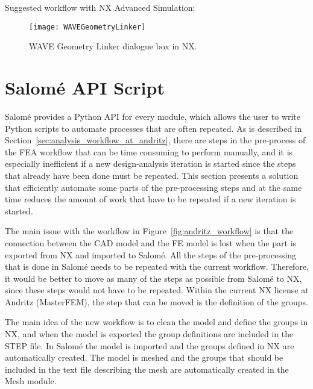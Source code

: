
Suggested workflow with NX Advanced Simulation:

\begin{figure}[t]
	\begin{center}
		\texttt{[image: WAVEGeometryLinker]}
	\end{center}
	\caption{WAVE Geometry Linker dialogue box in NX.}
	\label{fig:WAVEGeometryLinker}
\end{figure}

\section{Salomé API Script} %
\label{sec:salom_api_script}
Salomé provides a Python API for every module, which allows the user to write Python scripts to automate processes that are often repeated. As is described in Section~\ref{sec:analysis_workflow_at_andritz}, there are steps in the pre-process of the FEA workflow that can be time consuming to perform manually, and it is especially inefficient if a new design-analysis iteration is started since the steps that already have been done must be repeated. This section presents a solution that efficiently automate some parts of the pre-processing steps and at the same time reduces the amount of work that have to be repeated if a new iteration is started.

The main issue with the workflow in Figure~\ref{fig:andritz_workflow} is that the connection between the CAD model and the FE model is lost when the part is exported from NX and imported to Salomé. All the steps of the pre-processing that is done in Salomé needs to be repeated with the current workflow. Therefore, it would be better to move as many of the steps as possible from Salomé to NX, since these steps would not have to be repeated. Within the current NX license at Andritz (MasterFEM), the step that can be moved is the definition of the groups.

The main idea of the new workflow is to clean the model and define the groups in NX, and when the model is exported the group definitions are included in the STEP file. In Salomé the model is imported and the groups defined in NX are automatically created. The model is meshed and the groups that should be included in the text file describing the mesh are automatically created in the Mesh module.

